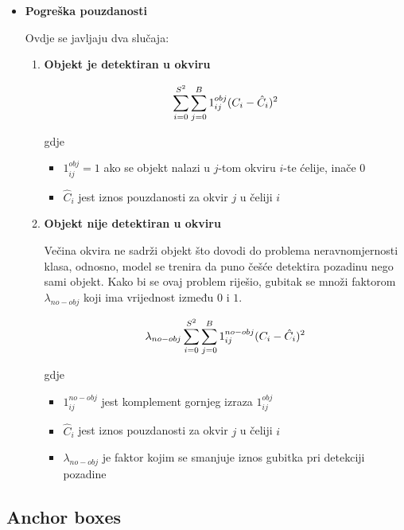 \begin{itemize}
	\item{\textbf{Pogreška pouzdanosti}}

	Ovdje se javljaju dva slučaja:
	\begin{enumerate}
		\item \textbf{Objekt je detektiran u okviru}
		
		\begin{equation}
			\centering
			\sum_{i=0}^{S^2}\sum_{j=0}^{B} 1_{ij}^{obj} (C_i - \hat{C}_i)^2
			\label{eq:confidence-loss-1}
		\end{equation}
		
		gdje 
		\begin{itemize}
			\item $1_{ij}^{obj} = 1$ ako se objekt nalazi u $j$-tom okviru $i$-te ćelije, inače $0$
			\item $\hat{C}_i$ jest iznos pouzdanosti za okvir $j$ u čeliji $i$
		\end{itemize}
		
		\item \textbf{Objekt nije detektiran u okviru}
		
		Večina okvira ne sadrži objekt što dovodi do problema neravnomjernosti klasa, odnosno, model se trenira da puno češće detektira pozadinu nego sami objekt. Kako bi se ovaj problem riješio, gubitak se množi faktorom $\lambda_{no-obj}$ koji ima vrijednost između $0$ i $1$.
		
		\begin{equation}
			\centering
			\lambda_{no-obj}\sum_{i=0}^{S^2}\sum_{j=0}^{B} 1_{ij}^{no-obj} (C_i - \hat{C}_i)^2
			\label{eq:confidence-loss-2}
		\end{equation}
		
		gdje 
		\begin{itemize}
			\item $1_{ij}^{no-obj}$ jest komplement gornjeg izraza $1_{ij}^{obj}$
			\item $\hat{C}_i$ jest iznos pouzdanosti za okvir $j$ u čeliji $i$
			\item $\lambda_{no-obj}$ je faktor kojim se smanjuje iznos gubitka pri detekciji pozadine
		\end{itemize}
		
	\end{enumerate}	
		
\end{itemize}

\subsection{Anchor boxes}
\label{anchor-boxes-section}

